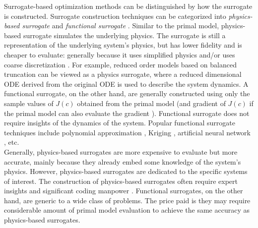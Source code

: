 \documentclass[a4paper,onecolumn]{article}
\theoremstyle{remark}
\begin{document}
\noindent Surrogate-based optimization methods can be distinguished by how the surrogate is 
constructed. Surrogate construction techniques can be categorized into
\emph{physics-based surrogate} and \emph{functional surrogate} \cite{Opt Koziel Book}.
Similar to the primal model, physics-based surrogate simulates the underlying physics.
The surrogate is still a representation of the underlying system's physics, but has 
lower fidelity and is cheaper to evaluate: generally because it
uses simplified physics \cite{simplified physics, Space mapping 1} and/or
uses coarse discretization \cite{coarse discretization}. For example, reduced order
models based on balanced truncation \cite{Balanced truncation} can be viewed as 
a physics surrogate, where a reduced dimensional ODE derived from the original 
ODE is used to describe the system dynamics.
A functional surrogate, on the other hand, are generally constructed using only the sample
values of $J(c)$ obtained from the primal model (and gradient of $J(c)$ if
the primal model can also evaluate the gradient \cite{gradient kriging surrogate}).
Functional surrogate does not require insights of the dynamics of the system. 
Popular functional surrogate techniques include polynomial approximation 
\cite{poly functional surrogate}, Kriging \cite{kriging functional surrogate},
artificial neural network \cite{ann functional surrogate}, etc.\\

\noindent Generally, physics-based surrogates are more expensive to evaluate but more accurate,
mainly because they already embed some knowledge of the system's physics. 
However, physics-based surrogates are dedicated to the specific systems of interest.
The construction of physics-based surrogates often require expert insights
and significant coding manpower \cite{Opt Koziel Book}. 
Functional surrogates, on the other hand, are generic to a wide class of problems.
The price paid is they may require considerable amount of primal model evaluation 
to achieve the same accuracy as physics-based surrogates. \\
\end{document}
